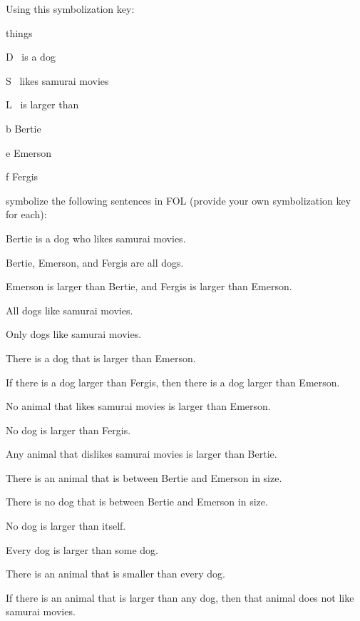 \problempart
Using this symbolization key:
\begin{ekey}
\item[\text{domain}] things
\item[D] \blank\ is a dog
\item[S] \blank\ likes samurai movies
\item[L] \blank\ is larger than \blank
\item[b] Bertie
\item[e] Emerson
\item[f] Fergis
\end{ekey}
symbolize the following sentences in FOL (provide your own symbolization key for each):
\begin{earg}
\item Bertie is a dog who likes samurai movies.
\item Bertie, Emerson, and Fergis are all dogs.
\item Emerson is larger than Bertie, and Fergis is larger than Emerson.
\item All dogs like samurai movies.
\item Only dogs like samurai movies.
\item There is a dog that is larger than Emerson.
\item If there is a dog larger than Fergis, then there is a dog larger than Emerson.
\item No animal that likes samurai movies is larger than Emerson.
\item No dog is larger than Fergis.
\item Any animal that dislikes samurai movies is larger than Bertie.
\item There is an animal that is between Bertie and Emerson in size.
\item There is no dog that is between Bertie and Emerson in size.
\item No dog is larger than itself.
\item Every dog is larger than some dog.
\item There is an animal that is smaller than every dog.
\item If there is an animal that is larger than any dog, then that animal does not like samurai movies.
\end{earg}

